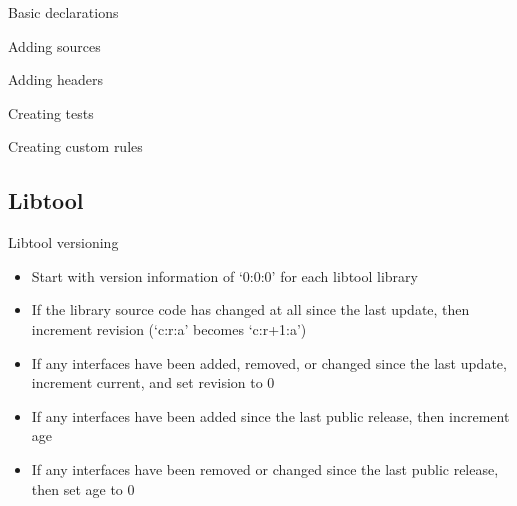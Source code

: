 \documentclass{beamer}
\begin{document}
\begin{frame}[t]{Basic declarations}
	\begin{small}
	
	\end{small}
\end{frame}

\begin{frame}[t]{Adding sources}
	\begin{small}
	
	\end{small}
\end{frame}

\begin{frame}[t]{Adding headers}
	\begin{small}
	
	\end{small}
\end{frame}

\begin{frame}[t]{Creating tests}
	\begin{small}
	
	\end{small}
\end{frame}

\begin{frame}[t]{Creating custom rules}
	\begin{small}
	
	\end{small}
\end{frame}

\subsection{Libtool}

\begin{frame}{Libtool versioning}
	\begin{itemize}
	\item Start with version information of ‘0:0:0’ for each libtool library
	\item If the library source code has changed at all since the last update, then increment revision (‘c:r:a’ becomes ‘c:r+1:a’)
	\item If any interfaces have been added, removed, or changed since the last update, increment current, and set revision to 0
	\item If any interfaces have been added since the last public release, then increment age
	\item If any interfaces have been removed or changed since the last public release, then set age to 0
	\end{itemize}
\end{frame}
\end{document}
